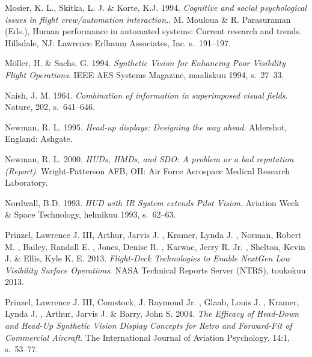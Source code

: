 \documentclass[utf8,bachelor,manualbib]{gradu3}
\begin{document}
\begin{thebibliography}{}
Mosier, K. L., Skitka, L. J. \& Korte, K.J. 1994.
\textit{Cognitive and social psychological issues in flight crew/automation interaction.}.
M. Mouloua \& R. Parasuraman (Eds.), Human performance in automated systems: Current research and trends. Hillsdale, NJ: Lawrence Erlbaum Associates, Inc. s.~191--197.

Möller, H. \& Sachs, G. 1994.
\textit{Synthetic Vision for Enhancing Poor Visibility Flight Operations}.
IEEE AES Systems Magazine, maaliskuu 1994, s.~27--33.

Naish, J. M. 1964.
\textit{Combination of information in superimposed visual fields}.
Nature, 202, s.~641--646.

Newman, R. L. 1995.
\textit{Head-up displays: Designing the way ahead}.
Aldershot, England: Ashgate.

Newman, R. L. 2000.
\textit{HUDs, HMDs, and SDO: A problem or a bad reputation (Report)}.
Wright-Patterson AFB, OH: Air Force Aerospace Medical Research Laboratory.

Nordwall, B.D. 1993.
\textit{HUD with IR System extends Pilot Vision}.
Aviation Week \& Space Technology, helmikuu 1993, s.~62--63.

Prinzel, Lawrence J. III, Arthur, Jarvis J. , Kramer, Lynda J. ,  Norman, Robert M. , Bailey, Randall E. , Jones, Denise R. ,  Karwac, Jerry R. Jr. , Shelton, Kevin J. \& Ellis, Kyle K. E. 2013.
\textit{Flight-Deck Technologies to Enable NextGen Low Visibility Surface Operations}.
NASA Technical Reports Server (NTRS), toukokuu 2013.

Prinzel, Lawrence J. III, Comstock, J. Raymond Jr. , Glaab, Louis J. , Kramer, Lynda J. , Arthur, Jarvis J. \& Barry, John S. 2004.
\textit{The Efficacy of Head-Down and Head-Up Synthetic Vision Display Concepts for Retro and Forward-Fit of Commercial Aircraft}.
The International Journal of Aviation Psychology, 14:1, s.~53--77.


\end{thebibliography}
\end{document}
